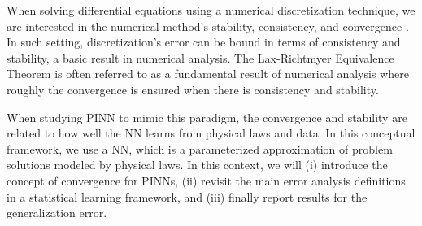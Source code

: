 \documentclass[pdflatex,sn-basic]{sn-jnl}%
\theoremstyle{thmstyleone}%
\theoremstyle{thmstyletwo}%
\theoremstyle{thmstylethree}%
\begin{document}
When solving differential equations using a numerical discretization technique, we are interested in the numerical method's stability, consistency, and convergence \citep{Rya2006_TheoreticalIntroductionNumerical_TsyRT, Arn2015_StabilityConsistencyConvergence_Arn, Tho1992_NumericalMethods101convergence_Tho}.
%
%
\\
In such setting, discretization's error can be bound in terms of consistency and stability, a basic result in numerical analysis.
The Lax-Richtmyer Equivalence Theorem is often referred to as a fundamental result of numerical analysis %
where 
roughly the convergence is ensured when there is consistency and stability.

%
When studying PINN to mimic this paradigm, the convergence and stability are related to how well the NN learns from physical laws and data.
%
In this conceptual framework, we use a NN, which is a parameterized approximation of problem solutions modeled by physical laws.
In this context, we will (i) introduce the concept of convergence for PINNs, (ii) revisit the main error analysis definitions in a statistical learning framework, and (iii) finally report results for the generalization error. 
\end{document}
